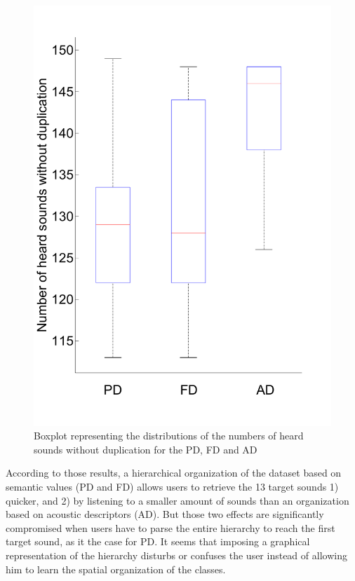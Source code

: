 \documentclass{aes2e}
\begin{document}
\begin{figure}[t]
\begin{center}
\includegraphics[scale=0.36]{gfx/SDbis.pdf} 
\end{center}
\caption{\label{fig3} Boxplot representing the distributions of the numbers of heard sounds without duplication for the PD, FD and AD}
\end{figure}

According to those results, a hierarchical organization of the dataset based on semantic values (PD and FD) allows users to retrieve the 13 target sounds 1) quicker, and 2) by listening to a smaller amount of sounds than an organization based on acoustic descriptors (AD). But those two effects are significantly compromised when users have to parse the entire hierarchy to reach the first target sound, as it the case for PD. It seems that imposing a graphical representation of the hierarchy disturbs or confuses the user instead of allowing him to learn the spatial organization of the classes. 
\end{document}
